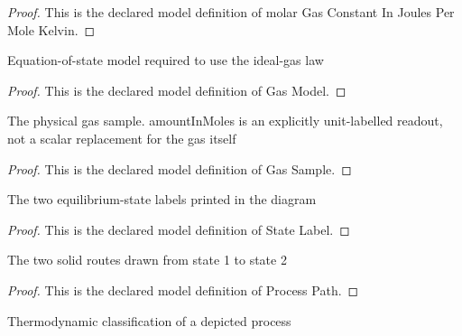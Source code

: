 \begin{proof}
  This is the declared model definition of molar Gas Constant In Joules Per Mole Kelvin.
\end{proof}
\begin{definition}
  \label{def:physics:phyx-mini-0369:phyxminiproblems-problemphyxmini0369-gasmodel}
  Equation-of-state model required to use the ideal-gas law
\end{definition}
\begin{proof}
  This is the declared model definition of Gas Model.
\end{proof}
\begin{definition}
  \label{def:physics:phyx-mini-0369:phyxminiproblems-problemphyxmini0369-gassample}
  The physical gas sample. amountInMoles is an explicitly unit-labelled readout, not a scalar replacement for the gas itself
\end{definition}
\begin{proof}
  This is the declared model definition of Gas Sample.
\end{proof}
\begin{definition}
  \label{def:physics:phyx-mini-0369:phyxminiproblems-problemphyxmini0369-statelabel}
  The two equilibrium-state labels printed in the diagram
\end{definition}
\begin{proof}
  This is the declared model definition of State Label.
\end{proof}
\begin{definition}
  \label{def:physics:phyx-mini-0369:phyxminiproblems-problemphyxmini0369-processpath}
  The two solid routes drawn from state 1 to state 2
\end{definition}
\begin{proof}
  This is the declared model definition of Process Path.
\end{proof}
\begin{definition}
  \label{def:physics:phyx-mini-0369:phyxminiproblems-problemphyxmini0369-processkind}
  Thermodynamic classification of a depicted process
\end{definition}
